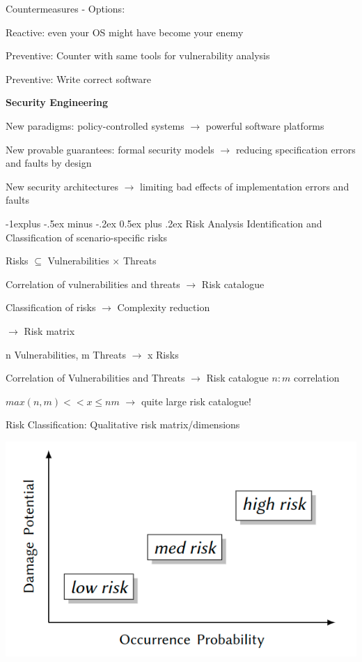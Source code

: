 \documentclass[a4paper]{article}
\makeatletter
\renewcommand{\note}[2]{\begin{noteBox} \textbf{#1} #2 \end{noteBox}}
\renewcommand{\subsection}{\@startsection{subsection}{2}{0mm}%
                                {-1explus -.5ex minus -.2ex}%
                                {0.5ex plus .2ex}%
                                {\normalfont\normalsize\bfseries}}
\makeatother
\begin{document}
\begin{multicols}{3}
    Countermeasures - Options:
    \begin{itemize*}
        \item Reactive: even your OS might have become your enemy
        \item Preventive: Counter with same tools for vulnerability analysis
        \item Preventive: Write correct software
    \end{itemize*}

    \note{Security Engineering}{
        \begin{itemize*}
            \item New paradigms: policy-controlled systems $\rightarrow$ powerful software platforms
            \item New provable guarantees: formal security models $\rightarrow$ reducing specification errors and faults by design
            \item New security architectures $\rightarrow$ limiting bad effects of implementation errors and faults
        \end{itemize*}
    }

    \subsection{Risk Analysis}
    Identification and Classification of scenario-specific risks
    \begin{itemize*}
        \item Risks $\subseteq$ Vulnerabilities $\times$ Threats
        \item Correlation of vulnerabilities and threats $\rightarrow$  Risk catalogue
        \item Classification of risks $\rightarrow$ Complexity reduction
        \item $\rightarrow$ Risk matrix
        \item n Vulnerabilities, m Threats $\rightarrow$ x Risks
        \item Correlation of Vulnerabilities and Threats $\rightarrow$ Risk catalogue $n:m$ correlation
        \item $max(n,m)<< x \leq nm$ $\rightarrow$ quite large risk catalogue!
    \end{itemize*}
    Risk Classification: Qualitative risk matrix/dimensions

    \includegraphics[width=.3\linewidth]{Assets/Systemsicherheit-risk-classification.png}


\end{multicols}
\end{document}
